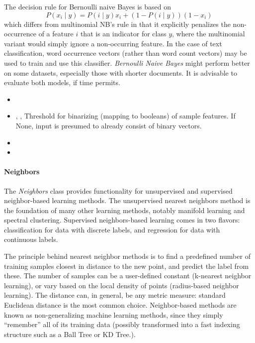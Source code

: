 %
The decision rule for Bernoulli naive Bayes is based on
\begin{equation}
P(x_i \mid y) = P(i \mid y) x_i + (1 - P(i \mid y)) (1 - x_i)
\end{equation}
which differs from multinomial NB's rule in that it explicitly penalizes the
non-occurrence of a feature $i$ that is an indicator for class $y$, where the
multinomial variant would simply ignore a non-occurring feature.
%
In the case of text classification, word occurrence vectors (rather than word
count vectors) may be used to train and use this classifier.
%
\textit{Bernoulli Naive Bayes} might perform better on some datasets, especially
those with shorter documents.
%
It is advisable to evaluate both models, if time permits.
%
\begin{itemize}
  \item {}
  \item {}, ,
  Threshold for binarizing (mapping to booleans) of sample features.
  If None, input is presumed to already consist of binary vectors.
  \item {}
  \item {}
\end{itemize}
\paragraph{Neighbors}
\label{Neighbors}

The \textit{Neighbors} class provides functionality for unsupervised and
supervised neighbor-based learning methods.
%
The unsupervised nearest neighbors method is the foundation of many other
learning methods, notably manifold learning and spectral clustering.
%
Supervised neighbors-based learning comes in two flavors: classification for
data with discrete labels, and regression for data with continuous labels.

The principle behind nearest neighbor methods is to find a predefined number of
training samples closest in distance to the new point, and predict the label
from these.
%
The number of samples can be a user-defined constant (k-nearest neighbor
learning), or vary based on the local density of points (radius-based neighbor
learning).
%
The distance can, in general, be any metric measure: standard Euclidean distance
is the most common choice.
%
Neighbor-based methods are known as non-generalizing machine learning methods,
since they simply ``remember'' all of its training data (possibly transformed
into a fast indexing structure such as a Ball Tree or KD Tree.).

